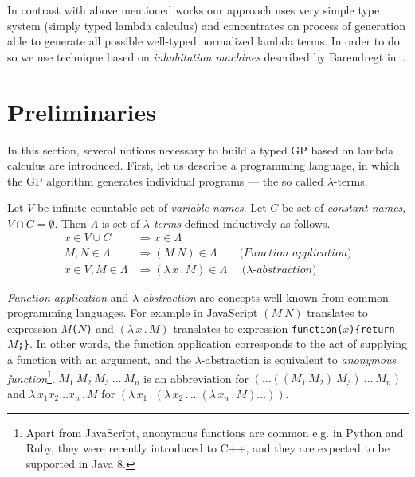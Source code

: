 \documentclass{llncs}
\newcommand{\lets}{let us\xspace}
\newcommand{\lterms}{$\lambda$-terms\xspace}
\newcommand{\then}{\Rightarrow\xspace}
\newcommand{\lamb}[2]{( \lambda \, #1 \, . \, #2 )}
\newcommand{\lam}[2]{\lambda \, #1 \, . \, #2}
\begin{document}
In contrast with above mentioned works our approach uses very simple type system 
(simply typed lambda calculus) and concentrates on process of generation  
able to generate all possible well-typed normalized lambda terms. In order to do
so we use technique based on \textit{inhabitation machines} 
described by Barendregt in~\cite{barendregt10}.    

\section{Preliminaries}
\label{preliminaries}

In this section, several notions necessary to build a typed GP based on lambda calculus are introduced. 
First, \lets 
describe a programming language, 
in which the GP algorithm generates individual programs --- the so called \lterms.  


\begin{definition}
Let $V$ be infinite countable set of {\it 
variable names}. Let $C$ be set of {\it constant names}, 
$V \cap C = \emptyset$.	 	
Then $\Lambda$ is set of {\it \lterms} defined inductively as follows.	
\begin{align*}
x   \in V \cup C  &\then x     \in \Lambda \\
M,N \in \Lambda   &\then (M~N) \in \Lambda 
\textit{~~~~~~(Function application)} \\
x   \in V , M \in \Lambda &\then \lamb{x}{M} \in \Lambda
\textit{~~~~($\lambda$-abstraction)} 
\end{align*}
\end{definition}

\textit{Function application} and 
\textit{$\lambda$-abstraction} are concepts
well known from common programming languages. 
For example in JavaScript 
$(M~N)$ translates to expression \texttt{$M$($N$)} and
$\lamb{x}{M}$ translates to expression \texttt{function($x$)\{return $M$;\}}.
In other words, the function application 
corresponds to the act of supplying a function 
with an argument, and
the $\lambda$-abstraction is equivalent to 
\textit{anonymous function}\footnote{Apart from JavaScript, anonymous functions are common e.g. in Python and Ruby, 
they were recently introduced to C++, and they are expected to be supported in Java 8.}.
$M_1~M_2~M_3~\dots~M_n$ is an abbreviation for $(\dots((M_1~M_2)~M_3)~\dots~M_n)$
and $\lam{x_1 x_2 \dots x_n }{M}$ for $\lamb{x_1}{\lamb{x_2}{\dots\lamb{x_n}{M}\dots}}$.
\end{document}
